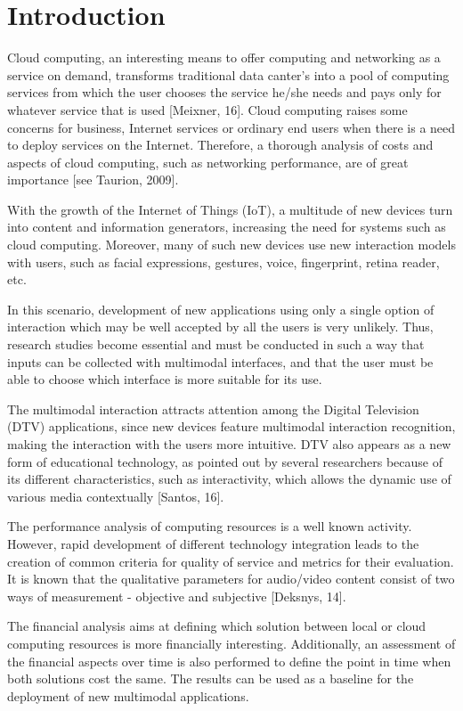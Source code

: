 \documentclass{cai}
\begin{document}
\section{Introduction}

Cloud computing, an interesting means to offer computing and networking as a service on demand, transforms traditional data canter's into a pool of computing services from which the user chooses the service he/she needs and pays only for whatever service that is used [Meixner, 16]. Cloud computing raises some concerns for business, Internet services or ordinary end users when there is a need to deploy services on the Internet. Therefore, a thorough analysis of costs and aspects of cloud computing, such as networking performance, are of great importance [see Taurion, 2009].

With the growth of the Internet of Things (IoT), a multitude of new devices turn into content and information generators, increasing the need for systems such as cloud computing. Moreover, many of such new devices use new interaction models with users, such as facial expressions, gestures, voice, fingerprint, retina reader, etc. 

In this scenario, development of new applications using only a single option of interaction which may be well accepted by all the users is very unlikely. Thus, research studies become essential and must be conducted in such a way that inputs can be collected with multimodal interfaces, and that the user must be able to choose which interface is more suitable for its use.

The multimodal interaction attracts attention among the Digital Television (DTV) applications, since new devices feature multimodal interaction recognition, making the interaction with the users more intuitive. DTV also appears as a 
new form of educational technology, as pointed out by several researchers because of its different characteristics, such as interactivity, which allows the dynamic use of various media contextually [Santos, 16].

The performance analysis of computing resources is a well known activity. However, rapid development of different technology integration leads to the creation of common criteria for quality of service and metrics for their evaluation. It is known that the qualitative parameters for audio/video content consist of two ways of measurement - objective and subjective [Deksnys, 14].

The financial analysis aims at defining which solution between local or cloud computing resources is more financially interesting. Additionally, an assessment of the financial aspects over time is also performed to define the point in time when both solutions cost the same. The results can be used as a baseline for the deployment of new multimodal applications.
\end{document}
